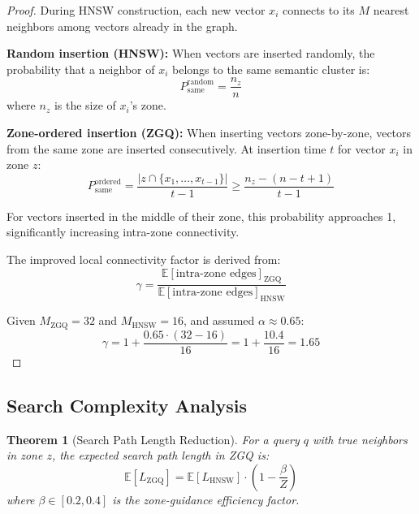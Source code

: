 \documentclass[11pt,a4paper]{article}
\newtheorem{theorem}{Theorem}[section]
\newcommand{\zgq}{\text{ZGQ}}
\newcommand{\hnsw}{\text{HNSW}}
\begin{document}
\begin{proof}
During HNSW construction, each new vector $x_i$ connects to its $M$ nearest neighbors among vectors already in the graph. 

\textbf{Random insertion (HNSW):} When vectors are inserted randomly, the probability that a neighbor of $x_i$ belongs to the same semantic cluster is:
\[
P_{\text{same}}^{\text{random}} = \frac{n_z}{n}
\]
where $n_z$ is the size of $x_i$'s zone.

\textbf{Zone-ordered insertion (ZGQ):} When inserting vectors zone-by-zone, vectors from the same zone are inserted consecutively. At insertion time $t$ for vector $x_i$ in zone $z$:
\[
P_{\text{same}}^{\text{ordered}} = \frac{|z \cap \{x_1, \ldots, x_{t-1}\}|}{t-1} \geq \frac{n_z - (n - t + 1)}{t - 1}
\]

For vectors inserted in the middle of their zone, this probability approaches 1, significantly increasing intra-zone connectivity.

The improved local connectivity factor is derived from:
\[
\gamma = \frac{\mathbb{E}[\text{intra-zone edges}]_{\zgq}}{\mathbb{E}[\text{intra-zone edges}]_{\hnsw}}
\]

Given $M_{\zgq} = 32$ and $M_{\hnsw} = 16$, and assumed $\alpha \approx 0.65$:
\[
\gamma = 1 + \frac{0.65 \cdot (32 - 16)}{16} = 1 + \frac{10.4}{16} = 1.65
\]
\end{proof}

\subsection{Search Complexity Analysis}

\begin{theorem}[Search Path Length Reduction]
\label{thm:path-length}
For a query $q$ with true neighbors in zone $z$, the expected search path length in ZGQ is:
\[
\mathbb{E}[L_{\zgq}] = \mathbb{E}[L_{\hnsw}] \cdot \left(1 - \frac{\beta}{Z}\right)
\]
where $\beta \in [0.2, 0.4]$ is the zone-guidance efficiency factor.
\end{theorem}
\end{document}

